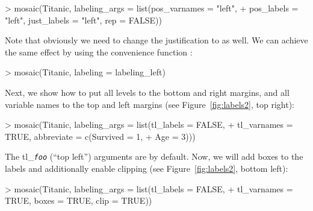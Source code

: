 \documentclass{Z}
\newcommand{\var}[1]{\textit{\texttt{#1}}}
\newcommand{\codefun}[1]{\code{#1()}}
\begin{document}
\begin{Schunk}
\begin{Sinput}
> mosaic(Titanic, labeling_args = list(pos_varnames = "left", 
+     pos_labels = "left", just_labels = "left", rep = FALSE))
\end{Sinput}
\end{Schunk}


\noindent Note that obviously we need to change the justification 
to  as well. We can
achieve the same effect by using the convenience function \codefun{labeling\_left}: 

\begin{Schunk}
\begin{Sinput}
> mosaic(Titanic, labeling = labeling_left)
\end{Sinput}
\end{Schunk}

\noindent Next, we show how to put all levels to the
bottom and right margins, and all variable names to the top and left
margins (see Figure~\ref{fig:labels2}, top right):

\begin{Schunk}
\begin{Sinput}
> mosaic(Titanic, labeling_args = list(tl_labels = FALSE, 
+     tl_varnames = TRUE, abbreviate = c(Survived = 1, 
+         Age = 3)))
\end{Sinput}
\end{Schunk}


\noindent The tl\_\var{foo} (``top left'') arguments are  by default. 
Now, we will add boxes to the labels and additionally
enable clipping (see Figure~\ref{fig:labels2}, bottom left):

\begin{Schunk}
\begin{Sinput}
> mosaic(Titanic, labeling_args = list(tl_labels = FALSE, 
+     tl_varnames = TRUE, boxes = TRUE, clip = TRUE))
\end{Sinput}
\end{Schunk}
\end{document}

